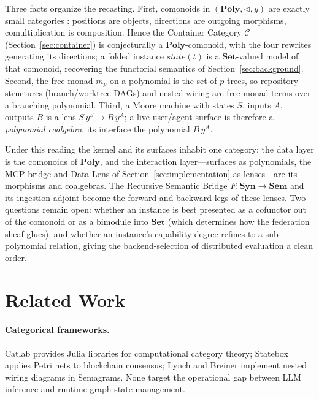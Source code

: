 \documentclass[submission,copyright,creativecommons]{eptcs}
\begin{document}
Three facts organize the recasting. First, comonoids in $(\mathbf{Poly},
\triangleleft, y)$ are exactly small categories \cite{ahman2016directed}:
positions are objects, directions are outgoing morphisms, comultiplication is
composition. Hence the Container Category $\mathcal{C}$
(Section~\ref{sec:container}) is conjecturally a $\mathbf{Poly}$-comonoid, with
the four rewrites generating its directions; a folded instance
$\mathit{state}(t)$ is a $\mathbf{Set}$-valued model of that comonoid, recovering
the functorial semantics of Section~\ref{sec:background}. Second, the free monad
$m_p$ on a polynomial is the set of $p$-trees, so repository structures
(branch/worktree DAGs) and nested wiring are free-monad terms over a branching
polynomial. Third, a Moore machine with states $S$, inputs $A$, outputs $B$ is a
lens $S\,y^{S} \to B\,y^{A}$; a live user/agent surface is therefore a
\emph{polynomial coalgebra}, its interface the polynomial $B\,y^{A}$.

Under this reading the kernel and its surfaces inhabit one category: the data
layer is the comonoids of $\mathbf{Poly}$, and the interaction layer---surfaces
as polynomials, the MCP bridge and Data Lens of Section~\ref{sec:implementation}
as lenses---are its morphisms and coalgebras. The Recursive Semantic Bridge
$F\colon \mathbf{Syn}\to\mathbf{Sem}$ and its ingestion adjoint become the
forward and backward legs of these lenses. Two questions remain open: whether an
instance is best presented as a cofunctor out of the comonoid or as a bimodule
into $\mathbf{Set}$ (which determines how the federation sheaf glues), and
whether an instance's capability degree refines to a sub-polynomial relation,
giving the backend-selection of distributed evaluation a clean order.

\section{Related Work}
\label{sec:related}

\paragraph{Categorical frameworks.}
Catlab \cite{catlab2024} provides Julia libraries for computational category
theory; Statebox \cite{statebox2019} applies Petri nets to blockchain
consensus; Lynch and Breiner \cite{lynch2023nested} implement nested wiring
diagrams in Semagrams. None target the operational gap between LLM inference
and runtime graph state management.
\end{document}
